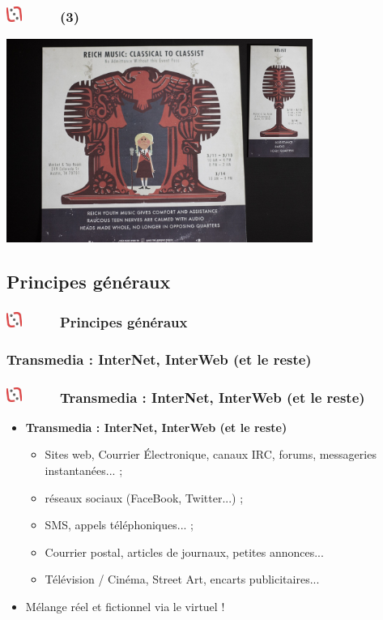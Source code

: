 \documentclass[slidetop,11pt]{beamer}
\def\moreInFrameTitleLeftt{\includegraphics[height=0.5cm]{img/ligueludique-0.png}~~~~~}
\begin{document}
\begin{frame}
	\frametitle{\moreInFrameTitleLeftt \sectionPartIIaVIII  (3) }
	\includegraphics[width=10.00cm]{img/ResistanceRadio/resistance-radio-secret-solved.jpg}~\\
\end{frame}



\def\sectionPartIIb{Principes g{\'e}n{\'e}raux}
\subsection{\sectionPartIIb} %
\begin{frame}
	\frametitle{\moreInFrameTitleLeftt \sectionPartIIb }
	\tableofcontents[sections=2,currentsection,subsectionstyle=show/shaded/hide]
\end{frame} 

\def\sectionPartIIbI{Transmedia : InterNet, InterWeb (et le reste)}
\subsubsection{\sectionPartIIbI} %
\begin{frame}
	\frametitle{\moreInFrameTitleLeftt \sectionPartIIbI }
	\begin{itemize}
		\item \textbf{ \sectionPartIIbI }
		\begin{itemize}
			\item Sites web, Courrier {\'E}lectronique, canaux IRC, forums, messageries instantan{\'e}es... ; 
			\item r{\'e}seaux sociaux (FaceBook, Twitter...) ; 
			\item SMS, appels t{\'e}l{\'e}phoniques... ; 
			\item Courrier postal, articles de journaux, petites annonces...
			\item T{\'e}l{\'e}vision / Cin{\'e}ma, Street Art, encarts publicitaires...
		\end{itemize}
		\item M{\'e}lange r{\'e}el et fictionnel via le virtuel !
	\end{itemize}
\end{frame} 
\end{document}
